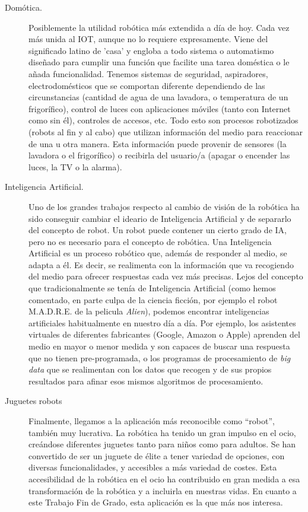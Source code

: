 \begin{description}
	\item [Domótica.] Posiblemente la utilidad robótica más extendida a día de hoy. Cada vez más unida al IOT, aunque no lo requiere expresamente. Viene del significado latino de 'casa' y engloba a todo sistema o automatismo diseñado para cumplir una función que facilite una tarea doméstica o le añada funcionalidad. Tenemos sistemas de seguridad, aspiradores, electrodomésticos que se comportan diferente dependiendo de las circunstancias (cantidad de agua de una lavadora, o temperatura de un frigorífico), control de luces con aplicaciones móviles (tanto con Internet como sin él), controles de accesos, etc. Todo esto son procesos robotizados (robots al fin y al cabo) que utilizan información del medio para reaccionar de una u otra manera. Esta información puede provenir de sensores (la lavadora o el frigorífico) o recibirla del usuario/a (apagar o encender las luces, la TV o la alarma).
	
	\item [Inteligencia Artificial.] Uno de los grandes trabajos respecto al cambio de visión de la robótica ha sido conseguir cambiar el ideario de Inteligencia Artificial y de separarlo del concepto de robot. Un robot puede contener un cierto grado de IA, pero no es necesario para el concepto de robótica. Una Inteligencia Artificial es un proceso robótico que, además de responder al medio, se adapta a él. Es decir, se realimenta con la información que va recogiendo del medio para ofrecer respuestas cada vez más precisas. Lejos del concepto que tradicionalmente se tenía de Inteligencia Artificial (como hemos comentado, en parte culpa de la ciencia ficción, por ejemplo el robot M.A.D.R.E. de la pelicula \textit{Alien}), podemos encontrar inteligencias artificiales habitualmente en nuestro día a día. Por ejemplo, los asistentes virtuales de diferentes fabricantes (Google, Amazon o Apple) aprenden del medio en mayor o menor medida y son capaces de buscar una respuesta que no tienen pre-programada, o los programas de procesamiento de \textit{big data} que se realimentan con los datos que recogen y de sus propios resultados para afinar esos mismos algoritmos de procesamiento.
	
	\item [Juguetes robots] Finalmente, llegamos a la aplicación más reconocible como ``robot'', también muy lucrativa. La robótica ha tenido un gran impulso en el ocio, creándose diferentes juguetes tanto para niños como para adultos. Se han convertido de ser un juguete de élite a tener variedad de opciones, con diversas funcionalidades, y accesibles a más variedad de costes. Esta accesibilidad de la robótica en el ocio ha contribuido en gran medida a esa transformación de la robótica y a incluirla en nuestras vidas. En cuanto a este Trabajo Fin de Grado, esta aplicación es la que más nos interesa.
\end{description}


